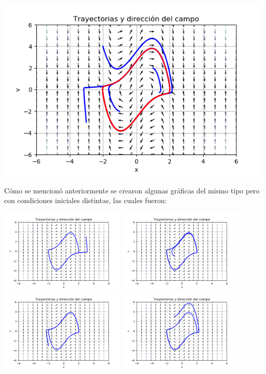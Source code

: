 \documentclass{article}
\begin{document}
\begin{center}
  \includegraphics[width=1\textwidth]{FasesCondiciones.png}
\end{center}
Cómo se mencionó anteriormente se crearon algunas gráficas del mismo tipo pero con condiciones iniciales distintas, las cuales fueron:
\begin{center}
  \includegraphics[width=0.45\textwidth]{Prueba1.png}
  \includegraphics[width=0.45\textwidth]{Prueba2.png}
  \includegraphics[width=0.45\textwidth]{Prueba3.png}
  \includegraphics[width=0.45\textwidth]{Prueba4.png}
\end{center}
\end{document}
